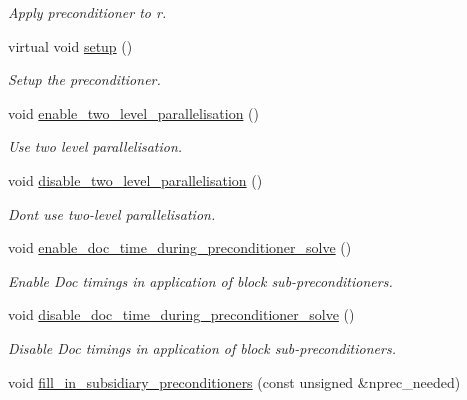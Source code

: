 \begin{DoxyCompactItemize}
\begin{DoxyCompactList}\small\item\em Apply preconditioner to r. \end{DoxyCompactList}\item 
virtual void \hyperlink{classoomph_1_1BlockDiagonalPreconditioner_a91bdd8e152045157f77c9cba513fe901}{setup} ()
\begin{DoxyCompactList}\small\item\em Setup the preconditioner. \end{DoxyCompactList}\item 
void \hyperlink{classoomph_1_1BlockDiagonalPreconditioner_a2510bf4e17c5afb2023bccd3db9b4169}{enable\+\_\+two\+\_\+level\+\_\+parallelisation} ()
\begin{DoxyCompactList}\small\item\em Use two level parallelisation. \end{DoxyCompactList}\item 
void \hyperlink{classoomph_1_1BlockDiagonalPreconditioner_a8f9dffebea9f173f53f9a815e46efa7c}{disable\+\_\+two\+\_\+level\+\_\+parallelisation} ()
\begin{DoxyCompactList}\small\item\em Don\textquotesingle{}t use two-\/level parallelisation. \end{DoxyCompactList}\item 
void \hyperlink{classoomph_1_1BlockDiagonalPreconditioner_a8b92dd0d3fba742334061711ce431b39}{enable\+\_\+doc\+\_\+time\+\_\+during\+\_\+preconditioner\+\_\+solve} ()
\begin{DoxyCompactList}\small\item\em Enable Doc timings in application of block sub-\/preconditioners. \end{DoxyCompactList}\item 
void \hyperlink{classoomph_1_1BlockDiagonalPreconditioner_a0df789685d30d01e073caa5740366149}{disable\+\_\+doc\+\_\+time\+\_\+during\+\_\+preconditioner\+\_\+solve} ()
\begin{DoxyCompactList}\small\item\em Disable Doc timings in application of block sub-\/preconditioners. \end{DoxyCompactList}\item 
void \hyperlink{classoomph_1_1BlockDiagonalPreconditioner_a16b97c5813edb8c029afda15d8b62862}{fill\+\_\+in\+\_\+subsidiary\+\_\+preconditioners} (const unsigned \&nprec\+\_\+needed)
\end{DoxyCompactItemize}
